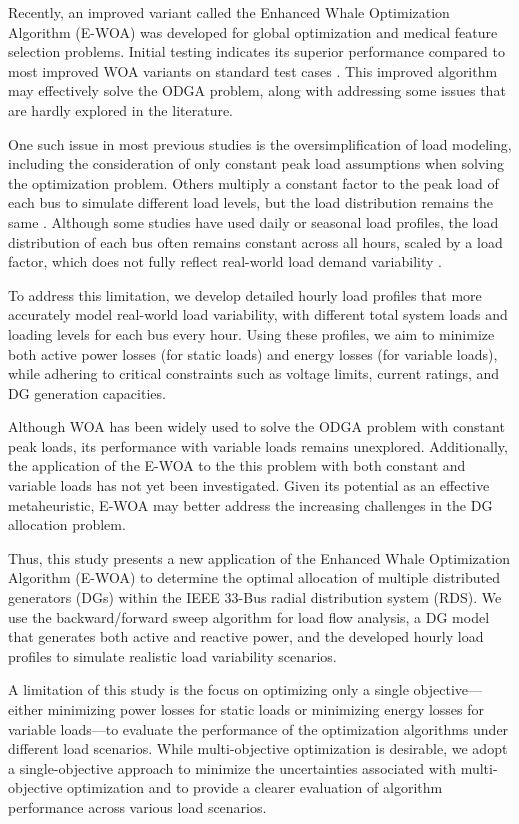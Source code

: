 \documentclass[conference]{IEEEtran}
\begin{document}
Recently, an improved variant called the Enhanced Whale Optimization Algorithm (E-WOA) was developed for global optimization and medical feature selection problems. Initial testing indicates its superior performance compared to most improved WOA variants on standard test cases \cite{EWOA}. This improved algorithm may effectively solve the ODGA problem, along with addressing some issues that are hardly explored in the literature.

One such issue in most previous studies is the oversimplification of load modeling, including the consideration of only constant peak load assumptions when solving the optimization problem. Others multiply a constant factor to the peak load of each bus to simulate different load levels, but the load distribution remains the same \cite{WOAreview2}. Although some studies have used daily or seasonal load profiles, the load distribution of each bus often remains constant across all hours, scaled by a load factor, which does not fully reflect real-world load demand variability \cite{purluseasonal}.

To address this limitation, we develop detailed hourly load profiles that more accurately model real-world load variability, with different total system loads and loading levels for each bus every hour. Using these profiles, we aim to minimize both active power losses (for static loads) and energy losses (for variable loads), while adhering to critical constraints such as voltage limits, current ratings, and DG generation capacities.

Although WOA has been widely used to solve the ODGA problem with constant peak loads, its performance with variable loads remains unexplored. Additionally, the application of the E-WOA to the this problem with both constant and variable loads has not yet been investigated. Given its potential as an effective metaheuristic, E-WOA may better address the increasing challenges in the DG allocation problem.

Thus, this study presents a new application of the Enhanced Whale Optimization Algorithm (E-WOA) to determine the optimal allocation of multiple distributed generators (DGs) within the IEEE 33-Bus radial distribution system (RDS). We use the backward/forward sweep algorithm for load flow analysis, a DG model that generates both active and reactive power, and the developed hourly load profiles to simulate realistic load variability scenarios.

A limitation of this study is the focus on optimizing only a single objective—either minimizing power losses for static loads or minimizing energy losses for variable loads—to evaluate the performance of the optimization algorithms under different load scenarios. While multi-objective optimization is desirable, we adopt a single-objective approach to minimize the uncertainties associated with multi-objective optimization and to provide a clearer evaluation of algorithm performance across various load scenarios. 
\end{document}
